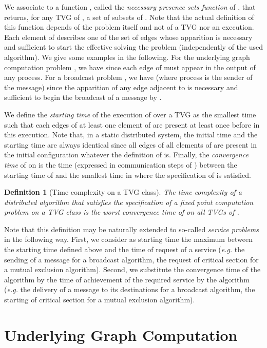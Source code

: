 \documentclass{article}
\newtheorem{definition}{Definition}
\begin{document}
We associate to  a function , called the \emph{necessary presence sets function} of , that returns, for any TVG  of , a set of subsets of . Note that the actual definition of this function depends of the problem itself and not of a TVG nor an execution. Each element of  describes one of the set of edges whose apparition is necessary and sufficient to start the effective solving the problem (independently of the used algorithm). We give some examples in the following. For the underlying graph computation problem , we have  since each edge of  must appear in the output of any process. For a broadcast problem , we have  (where process  is the sender of the message) since the apparition of any edge adjacent to  is necessary and sufficient to begin the broadcast of a message by .

We define the \emph{starting time} of the execution  of  over a TVG  as the smallest time  such that each edges of at least one element of  are present at least once before  in this execution. Note that, in a static distributed system, the initial time and the starting time are always identical since all edges of all elements of  are present in the initial configuration whatever the definition of  is. Finally, the \emph{convergence time} of  on  is the time (expressed in communication steps of ) between the starting time of  and the smallest time in  where the specification of  is satisfied.

\begin{definition}[Time complexity on a TVG class]
The time complexity of a distributed algorithm  that satisfies the specification of a fixed point computation problem  on a TVG class  is the worst convergence time of  on all TVGs of .
\end{definition}

Note that this definition may be naturally extended to so-called \emph{service problems} in the following way. First, we consider as starting time the maximum between the starting time defined above and the time of request of a service (\emph{e.g.} the sending of a message for a broadcast algorithm, the request of critical section for a mutual exclusion algorithm). Second, we substitute the convergence time of the algorithm by the time of achievement of the required service by the algorithm (\emph{e.g.} the delivery of a message to its destinations for a broadcast algorithm, the starting of critical section for a mutual exclusion algorithm).

\section{Underlying Graph Computation}\label{sec:UG}
\end{document}
